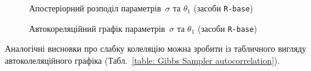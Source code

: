 \vspace{0.4cm}
\begin{figure}[H]\centering
    \caption{Апостеріорний розподіл параметрів~$\sigma$ та $\theta_1$ (засоби \texttt{R-base})}
    \label{pic: Gibbs Sampler traceplot}
\end{figure}

\vspace{0.4cm}
\begin{figure}[H]\centering
    \caption{Автокореляційний графік параметрів~$\sigma$ та $\theta_1$ (засоби \texttt{R-base})}
    \label{pic: Gibbs Sampler autocorrelation}
\end{figure}

Аналогічні висновки про слабку колеляцію можна зробити із табличного вигляду автоколеляційного графіка (Табл.~\ref{table: Gibbs Sampler autocorrelation}).

